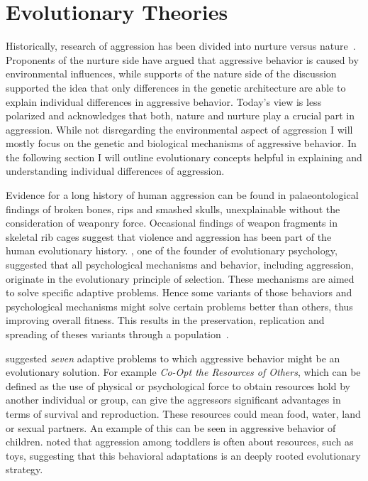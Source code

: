 \documentclass[../header.tex]{subfiles}
\begin{document}
\section{Evolutionary Theories}
\label{sec:evolutionary_theories}

Historically, research of aggression has been divided into nurture versus nature~\cite{Archer2009}. 
Proponents of the nurture side have argued that aggressive behavior is caused by environmental influences, while supports of the nature side of the discussion supported the idea that only differences in the genetic architecture are able to explain individual differences in aggressive behavior.
Today's view is less polarized and acknowledges that both, nature and nurture play a crucial part in aggression.
While not disregarding the environmental aspect of aggression I will mostly focus on the genetic and biological mechanisms of aggressive behavior.
In the following section I will outline evolutionary concepts helpful in explaining and understanding individual differences of aggression. 

Evidence for a long history of human aggression can be found in  palaeontological findings of broken bones, rips and smashed skulls, unexplainable without the consideration of weaponry force.
Occasional findings of weapon fragments in skeletal rib cages suggest that violence and aggression has been part of the human evolutionary history. 
\citet{Buss1997}, one of the founder of evolutionary psychology, suggested that all psychological mechanisms and behavior, including aggression, originate in the evolutionary principle of selection.  
These mechanisms are aimed to solve specific adaptive problems.
Hence some variants of those behaviors and psychological mechanisms might solve certain problems better than others, thus improving overall fitness.
This results in the preservation, replication and spreading of theses variants through a population~\cite{Buss1997}.

\citet{Buss1997} suggested \textit{seven} adaptive problems to which aggressive behavior might be an evolutionary solution.
For example \textit{Co-Opt the Resources of Others}, which can be defined as the use of physical or psychological force to obtain resources hold by another individual or group, can give the aggressors significant advantages in terms of survival and reproduction.
These resources could mean food, water, land or sexual partners.
An example of this can be seen in aggressive behavior of children.
\citet{Campbell1995} noted that aggression among toddlers is often about resources, such as toys, suggesting that this behavioral adaptations is an deeply rooted evolutionary strategy.
\end{document}
